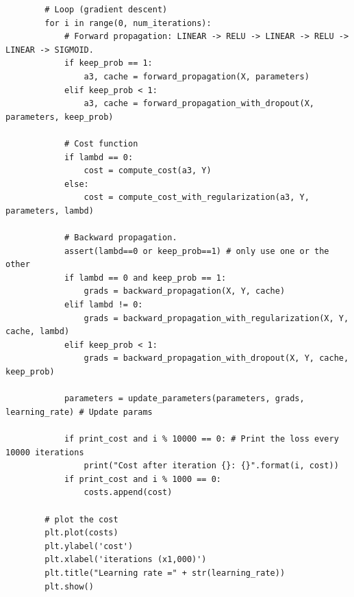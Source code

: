 \documentclass[11pt, a4paper]{article}
\begin{document}
\begin{spacing}{1.1}
\begin{lstlisting}
		# Loop (gradient descent)
		for i in range(0, num_iterations):
			# Forward propagation: LINEAR -> RELU -> LINEAR -> RELU -> LINEAR -> SIGMOID.
			if keep_prob == 1:
				a3, cache = forward_propagation(X, parameters)
			elif keep_prob < 1:
				a3, cache = forward_propagation_with_dropout(X, parameters, keep_prob)
			
			# Cost function
			if lambd == 0:
				cost = compute_cost(a3, Y)
			else:
				cost = compute_cost_with_regularization(a3, Y, parameters, lambd)
			
			# Backward propagation.
			assert(lambd==0 or keep_prob==1) # only use one or the other
			if lambd == 0 and keep_prob == 1:
				grads = backward_propagation(X, Y, cache)
			elif lambd != 0:
				grads = backward_propagation_with_regularization(X, Y, cache, lambd)
			elif keep_prob < 1:
				grads = backward_propagation_with_dropout(X, Y, cache, keep_prob)
			
			parameters = update_parameters(parameters, grads, learning_rate) # Update params
		
			if print_cost and i % 10000 == 0: # Print the loss every 10000 iterations
				print("Cost after iteration {}: {}".format(i, cost))
			if print_cost and i % 1000 == 0:
				costs.append(cost)
		
		# plot the cost
		plt.plot(costs)
		plt.ylabel('cost')
		plt.xlabel('iterations (x1,000)')
		plt.title("Learning rate =" + str(learning_rate))
		plt.show()
		

\end{lstlisting}
\end{spacing}
\end{document}

